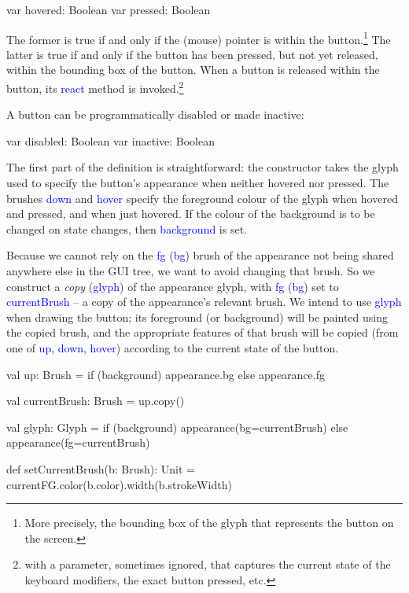 \documentclass[12pt,a4paper]{article}
\def\Scala#1{\textcolor{blue}{\textsf{#1}}}
\begin{document}
\begin{scala}
    var hovered:  Boolean
    var pressed:  Boolean
\end{scala}

The former is true if and only if the (mouse) pointer is within the
button.\footnote{More precisely, the bounding
box of the glyph that represents the button on the screen.} The
latter is true if and only if the button has been pressed, but not
yet released, within the bounding box of the button. When a button is
released within the button, its \Scala{react} method is
invoked.\footnote{with a parameter, sometimes ignored, that captures the
current state of the keyboard modifiers, the exact button pressed, etc.}

A button can be programmatically disabled or made inactive:
\begin{scala}
    var disabled: Boolean
    var inactive: Boolean
\end{scala}

The first part of the definition is straightforward: the constructor
takes the glyph used to specify the button's appearance when neither
hovered nor pressed. The brushes \Scala{down} and \Scala{hover} specify
the foreground colour of the glyph when hovered and pressed, and when
just hovered. If the colour of the background is to be changed on
state changes, then \Scala{background} is set.

\begin{scala}
class ColourButton(
  appearance:     Glyph,
  down:           Brush,
  hover:          Brush,
  val background: Boolean, 
  val react:      Reaction) extends GenericButton {
  
  override def toString: String =
           s"ColourButton($up, $down, $hover, $background)"
\end{scala}

Because we cannot rely on the \Scala{fg} (\Scala{bg}) brush of the appearance
not being shared anywhere else in the GUI tree, we want to avoid
changing that brush. So we construct a \textit{copy} (\Scala{glyph})
of the appearance glyph, with \Scala{fg} (\Scala{bg}) set to \Scala{currentBrush}
-- a copy of the appearance's relevant brush. We intend to use
\Scala{glyph} when drawing the button; its  foreground (or background)  will
be painted using the copied brush, and the appropriate features of
that brush will be copied (from one of \Scala{up, down, hover})
according to the current state of the button.

\begin{scala}
   val up: Brush =
       if (background) appearance.bg else appearance.fg

   val currentBrush: Brush = up.copy()

   val glyph: Glyph        =
       if (background)
          appearance(bg=currentBrush)
       else
          appearance(fg=currentBrush)

   def setCurrentBrush(b: Brush): Unit = {
      currentFG.color(b.color).width(b.strokeWidth)
    }
\end{scala}
\end{document}
